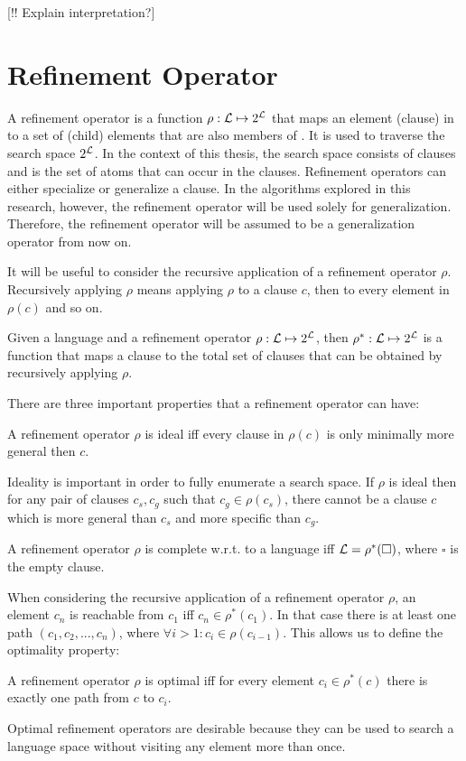 [!! Explain interpretation?]

\section{Refinement Operator}
A refinement operator is a function $\rho : \mathcal{L} \mapsto 2^{\mathcal{L}}$ that maps an element (clause) in  to a set of (child) elements that are also members of . It is used to traverse the search space $2^{\mathcal{L}}$. In the context of this thesis, the search space consists of clauses and  is the set of atoms that can occur in the clauses. Refinement operators can either specialize or generalize a clause. In the algorithms explored in this research, however, the refinement operator will be used solely for generalization. Therefore, the refinement operator will be assumed to be a generalization operator from now on.

It will be useful to consider the recursive application of a refinement operator $\rho$. Recursively applying $\rho$ means applying $\rho$ to a clause $c$, then to every element in $\rho(c)$ and so on.
\begin{definition}
Given a language  and a refinement operator $\rho: \mathcal{L} \mapsto 2^{\mathcal{L}}$, then $\rho^* : \mathcal{L} \mapsto 2^{\mathcal{L}}$ is a function that maps a clause to the total set of clauses that can be obtained by recursively applying $\rho$.
\end{definition}
There are three important properties that a refinement operator can have:
\begin{definition}
A refinement operator $\rho$ is ideal iff every clause in $\rho(c)$ is only minimally more general then $c$.
\end{definition}
Ideality is important in order to fully enumerate a search space. If $\rho$ is ideal then for any pair of clauses $c_s, c_g$ such that $c_g \in \rho(c_s)$, there cannot be a clause $c$ which is more general than $c_s$ and more specific than $c_g$.
\begin{definition}
A refinement operator $\rho$ is complete w.r.t. to a language  iff $\mathcal{L} = \rho^*(\square)$, where $\square$ is the empty clause.
\end{definition}
When considering the recursive application of a refinement operator $\rho$, an element $c_n$ is reachable from $c_1$ iff $c_n \in \rho^*(c_1)$. In that case there is at least one path $(c_1, c_2, ..., c_n)$, where $\forall i > 1: c_i \in \rho(c_{i-1})$. This allows us to define the optimality property:
\begin{definition}
A refinement operator $\rho$ is optimal iff for every element $c_i \in \rho^*(c)$ there is exactly one path from $c$ to $c_i$.
\end{definition}
Optimal refinement operators are desirable because they can be used to search a language space  without visiting any element more than once.

